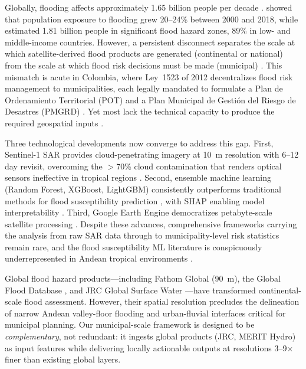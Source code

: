 \documentclass{article}
\begin{document}
Globally, flooding affects approximately 1.65 billion people per decade \citep{UNDRR2020}. \citet{Tellman2021} showed that population exposure to flooding grew 20--24\% between 2000 and 2018, while \citet{Rentschler2022} estimated 1.81 billion people in significant flood hazard zones, 89\% in low- and middle-income countries. However, a persistent disconnect separates the scale at which satellite-derived flood products are generated (continental or national) from the scale at which flood risk decisions must be made (municipal) \citep{Bates2023}. This mismatch is acute in Colombia, where Ley~1523 of 2012 decentralizes flood risk management to municipalities, each legally mandated to formulate a Plan de Ordenamiento Territorial (POT) and a Plan Municipal de Gesti\'on del Riesgo de Desastres (PMGRD) \citep{CongresoCol2012}. Yet most lack the technical capacity to produce the required geospatial inputs \citep{OECD2019}.

Three technological developments now converge to address this gap. First, Sentinel-1 SAR provides cloud-penetrating imagery at \SI{10}{\metre} resolution with 6--12 day revisit, overcoming the $>$70\% cloud contamination that renders optical sensors ineffective in tropical regions \citep{Twele2016, DeVries2020}. Second, ensemble machine learning (Random Forest, XGBoost, LightGBM) consistently outperforms traditional methods for flood susceptibility prediction \citep{Mosavi2018, Darabi2021}, with SHAP enabling model interpretability \citep{Lundberg2017}. Third, Google Earth Engine democratizes petabyte-scale satellite processing \citep{Gorelick2017}. Despite these advances, comprehensive frameworks carrying the analysis from raw SAR data through to municipality-level risk statistics remain rare, and the flood susceptibility ML literature is conspicuously underrepresented in Andean tropical environments \citep{FloodRiskLAC2022}.

Global flood hazard products---including Fathom Global (\SI{90}{\metre}), the Global Flood Database \citep{Tellman2021}, and JRC Global Surface Water \citep{Pekel2016}---have transformed continental-scale flood assessment. However, their spatial resolution precludes the delineation of narrow Andean valley-floor flooding and urban-fluvial interfaces critical for municipal planning. Our municipal-scale framework is designed to be \textit{complementary}, not redundant: it ingests global products (JRC, MERIT Hydro) as input features while delivering locally actionable outputs at resolutions 3--9$\times$ finer than existing global layers.
\end{document}
